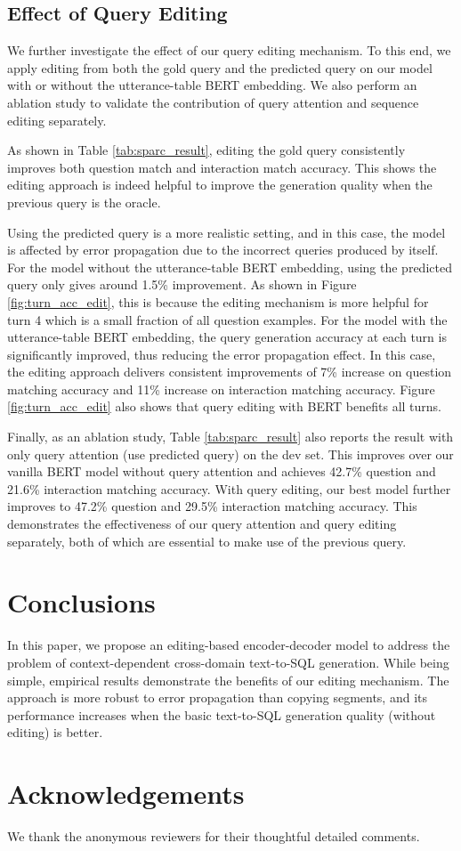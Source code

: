 \documentclass[11pt,a4paper]{article}
\begin{document}
\subsection{Effect of Query Editing}
We further investigate the effect of our query editing mechanism.
To this end, we apply editing from both the gold query and the predicted query on our model with or without the utterance-table BERT embedding.
We also perform an ablation study to validate the contribution of query attention and sequence editing separately.

As shown in Table \ref{tab:sparc_result}, editing the gold query consistently improves both question match and interaction match accuracy.
This shows the editing approach is indeed helpful to improve the generation quality when the previous query is the oracle.

Using the predicted query is a more realistic setting, and in this case, the model is affected by error propagation due to the incorrect queries produced by itself.
For the model without the utterance-table BERT embedding, using the predicted query only gives around 1.5\% improvement.
As shown in Figure \ref{fig:turn_acc_edit}, this is because the editing mechanism is more helpful for turn 4 which is a small fraction of all question examples.
For the model with the utterance-table BERT embedding, the query generation accuracy at each turn is significantly improved, thus reducing the error propagation effect.
In this case, the editing approach delivers consistent improvements of 7\% increase on question matching accuracy and 11\% increase on interaction matching accuracy.
Figure \ref{fig:turn_acc_edit} also shows that query editing with BERT benefits all turns.

Finally, as an ablation study, Table \ref{tab:sparc_result} also reports the result with only query attention (use predicted query) on the dev set.
This improves over our vanilla BERT model without query attention and achieves 42.7\% question and 21.6\% interaction matching accuracy.
With query editing, our best model further improves to 47.2\% question and 29.5\% interaction matching accuracy.
This demonstrates the effectiveness of our query attention and query editing separately, both of which are essential to make use of the previous query.

\vspace{-2mm}
\section{Conclusions}
\vspace{-2mm}
In this paper, we propose an editing-based encoder-decoder model to address the problem of context-dependent cross-domain text-to-SQL generation.
While being simple, empirical results demonstrate the benefits of our editing mechanism.
The approach is more robust to error propagation than copying segments, and its performance increases when the basic text-to-SQL generation quality (without editing) is better.


\section*{Acknowledgements}
We thank the anonymous reviewers for their thoughtful detailed comments.



\end{document}
